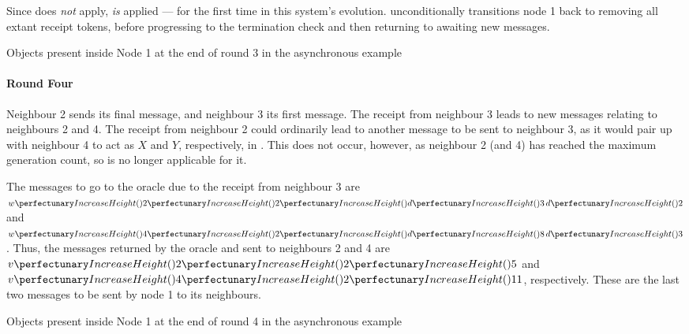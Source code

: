 Since  does \emph{not} apply,  \emph{is} applied --- for the first time in this system's evolution.   unconditionally transitions node 1 back to removing all extant receipt tokens, before progressing to the termination check and then returning to awaiting new messages.

\begin{cpobjectsfloat}
\begin{cpobjects}
\end{cpobjects}
\caption{\label{objs:nmp:ex3}Objects present inside Node 1 at the end of round 3 in the asynchronous  example}
\end{cpobjectsfloat}

\paragraph{Round Four}
Neighbour 2 sends its final message, and neighbour 3 its first message.  The receipt from neighbour 3 leads to new messages relating to neighbours 2 and 4.  The receipt from neighbour 2 could ordinarily lead to another message to be sent to neighbour 3, as it would pair up with neighbour 4 to act as \(X\) and \(Y\), respectively, in .  This does not occur, however, as neighbour 2 (and 4) has reached the maximum generation count, so  is no longer applicable for it.

The messages to go to the oracle due to the receipt from neighbour 3 are \(\cpvw{2}{2}{\cpfunc{d}{3} \, \cpfunc{d}{2}}\) and \(\cpvw{4}{2}{\cpfunc{d}{8} \, \cpfunc{d}{3}}\).  Thus, the messages returned by the oracle and sent to neighbours 2 and 4 are \(\cpvv{2}{2}{5}\) and \(\cpvv{4}{2}{11}\), respectively.  These are the last two messages to be sent by node 1 to its neighbours.

\begin{cpobjectsfloat}
\begin{cpobjects}
\end{cpobjects}
\caption{\label{objs:nmp:ex4}Objects present inside Node 1 at the end of round 4 in the asynchronous  example}
\end{cpobjectsfloat}

